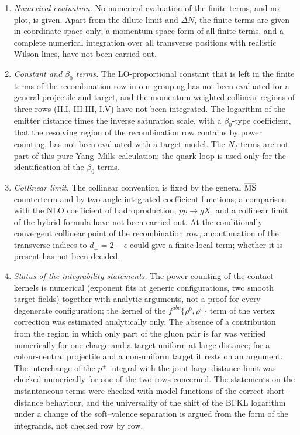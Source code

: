 \begin{enumerate}
\item[(iv)] \emph{Numerical evaluation.} No numerical evaluation of the finite terms, and no plot, is given. Apart from the dilute limit and $\Delta N$, the finite terms are given in coordinate space only; a momentum-space form of all finite terms, and a complete numerical integration over all transverse positions with realistic Wilson lines, have not been carried out.
\item[(v)] \emph{Constant and $\beta_0$ terms.} The LO-proportional constant that is left in the finite terms of the recombination row in our grouping has not been evaluated for a general projectile and target, and the momentum-weighted collinear regions of three rows (II.I, III.III, I.V) have not been integrated. The logarithm of the emitter distance times the inverse saturation scale, with a $\beta_0$-type coefficient, that the resolving region of the recombination row contains by power counting, has not been evaluated with a target model. The $N_f$ terms are not part of this pure Yang--Mills calculation; the quark loop is used only for the identification of the $\beta_0$ terms.
\item[(vi)] \emph{Collinear limit.} The collinear convention is fixed by the general $\overline{\rm MS}$ counterterm and by two angle-integrated coefficient functions; a comparison with the NLO coefficient of hadroproduction, $pp\to gX$, and a collinear limit of the hybrid formula have not been carried out. At the conditionally convergent collinear point of the recombination row, a continuation of the transverse indices to $d_\perp=2-\epsilon$ could give a finite local term; whether it is present has not been decided.
\item[(vii)] \emph{Status of the integrability statements.} The power counting of the contact kernels is numerical (exponent fits at generic configurations, two smooth target fields) together with analytic arguments, not a proof for every degenerate configuration; the kernel of the $f^{abc}\{\rho^b,\rho^c\}$ term of the vertex correction was estimated analytically only. The absence of a contribution from the region in which only part of the gluon pair is far was verified numerically for one charge and a target uniform at large distance; for a colour-neutral projectile and a non-uniform target it rests on an argument. The interchange of the $p^+$ integral with the joint large-distance limit was checked numerically for one of the two rows concerned. The statements on the instantaneous terms were checked with model functions of the correct short-distance behaviour, and the universality of the shift of the BFKL logarithm under a change of the soft--valence separation is argued from the form of the integrands, not checked row by row.
\end{enumerate}
